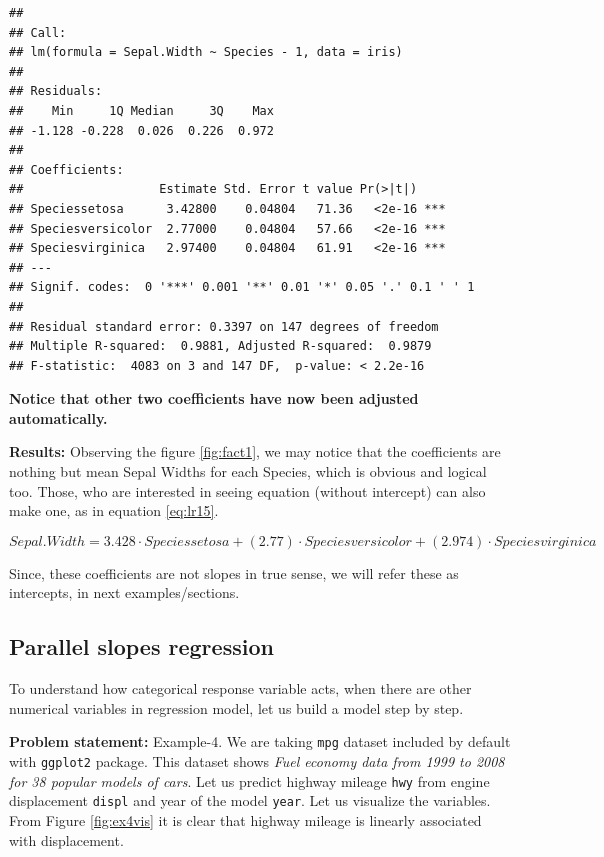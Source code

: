 \documentclass[
]{book}
\begin{document}
\begin{verbatim}
## 
## Call:
## lm(formula = Sepal.Width ~ Species - 1, data = iris)
## 
## Residuals:
##    Min     1Q Median     3Q    Max 
## -1.128 -0.228  0.026  0.226  0.972 
## 
## Coefficients:
##                   Estimate Std. Error t value Pr(>|t|)    
## Speciessetosa      3.42800    0.04804   71.36   <2e-16 ***
## Speciesversicolor  2.77000    0.04804   57.66   <2e-16 ***
## Speciesvirginica   2.97400    0.04804   61.91   <2e-16 ***
## ---
## Signif. codes:  0 '***' 0.001 '**' 0.01 '*' 0.05 '.' 0.1 ' ' 1
## 
## Residual standard error: 0.3397 on 147 degrees of freedom
## Multiple R-squared:  0.9881, Adjusted R-squared:  0.9879 
## F-statistic:  4083 on 3 and 147 DF,  p-value: < 2.2e-16
\end{verbatim}

\textbf{Notice that other two coefficients have now been adjusted automatically.}

\textbf{Results:} Observing the figure \ref{fig:fact1}, we may notice that the coefficients are nothing but mean Sepal Widths for each Species, which is obvious and logical too. Those, who are interested in seeing equation (without intercept) can also make one, as in equation \eqref{eq:lr15}.

\begin{equation} 
{Sepal.Width} = 3.428\cdot{Speciessetosa} + (2.77)\cdot{Speciesversicolor} + (2.974)\cdot{Speciesvirginica}
\label{eq:lr15}
\end{equation}

Since, these coefficients are not slopes in true sense, we will refer these as intercepts, in next examples/sections.

\hypertarget{parallel-slopes-regression}{%
\subsection{Parallel slopes regression}\label{parallel-slopes-regression}}

To understand how categorical response variable acts, when there are other numerical variables in regression model, let us build a model step by step.

\textbf{Problem statement:} Example-4. We are taking \texttt{mpg} dataset included by default with \texttt{ggplot2} package. This dataset shows \emph{Fuel economy data from 1999 to 2008 for 38 popular models of cars}. Let us predict highway mileage \texttt{hwy} from engine displacement \texttt{displ} and year of the model \texttt{year}. Let us visualize the variables. From Figure \ref{fig:ex4vis} it is clear that highway mileage is linearly associated with displacement.
\end{document}
